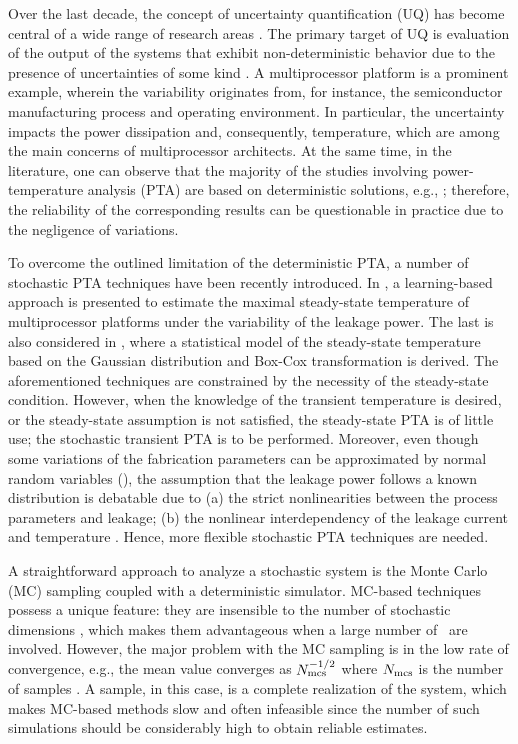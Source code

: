 Over the last decade, the concept of uncertainty quantification (UQ) has become central of a wide range of research areas \cite{xiu2010}. The primary target of UQ is evaluation of the output of the systems that exhibit non-deterministic behavior due to the presence of uncertainties of some kind \cite{eldred2009}. A multiprocessor platform is a prominent example, wherein the variability originates from, for instance, the semiconductor manufacturing process and operating environment. In particular, the uncertainty impacts the power dissipation and, consequently, temperature, which are among the main concerns of multiprocessor architects. At the same time, in the literature, one can observe that the majority of the studies involving power-temperature analysis (PTA) are based on deterministic solutions, e.g., \cite{ukhov2012}; therefore, the reliability of the corresponding results can be questionable in practice due to the negligence of variations.

To overcome the outlined limitation of the deterministic PTA, a number of stochastic PTA techniques have been recently introduced. In \cite{juan2011}, a learning-based approach is presented to estimate the maximal steady-state temperature of multiprocessor platforms under the variability of the leakage power. The last is also considered in \cite{juan2012}, where a statistical model of the steady-state temperature based on the Gaussian distribution and Box-Cox transformation is derived. The aforementioned techniques are constrained by the necessity of the steady-state condition. However, when the knowledge of the transient temperature is desired, or the steady-state assumption is not satisfied, the steady-state PTA is of little use; the stochastic transient PTA is to be performed. Moreover, even though some variations of the fabrication parameters can be approximated by normal random variables (\rvs), the assumption that the leakage power follows a known distribution is debatable due to (a) the strict nonlinearities between the process parameters and leakage; (b) the nonlinear interdependency of the leakage current and temperature \cite{liu2007}. Hence, more flexible stochastic PTA techniques are needed.

A straightforward approach to analyze a stochastic system is the Monte Carlo (MC) sampling coupled with a deterministic simulator. MC-based techniques possess a unique feature: they are insensible to the number of stochastic dimensions \cite{maitre2010}, which makes them advantageous when a large number of \rvs\ are involved. However, the major problem with the MC sampling is in the low rate of convergence, e.g., the mean value converges as $N_\text{mcs}^{-{{1}/{2}}}$ where $N_\text{mcs}$ is the number of samples \cite{xiu2010, maitre2010}. A sample, in this case, is a complete realization of the system, which makes MC-based methods slow and often infeasible since the number of such simulations should be considerably high to obtain reliable estimates.

